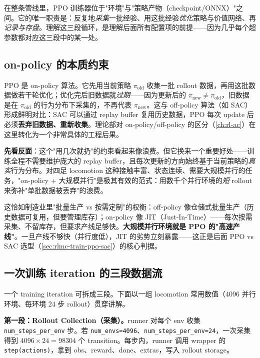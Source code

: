 在整条管线里，PPO 训练器位于"环境"与"策略产物（checkpoint/ONNX）"之间。它的唯一职责是：反复地\emph{采集}一批经验、用这批经验\emph{优化}策略与价值网络、再\emph{记录与存盘}。理解这三段循环，是理解后面所有配置项的前提——因为几乎每个超参数都对应这三段中的某一处。

\subsection{on-policy 的本质约束}

PPO 是 on-policy 算法。它先用当前策略 $\pi_{\text{old}}$ 收集一批 rollout 数据，再用这批数据做若干轮优化；优化完后旧数据就\emph{过期}——因为更新后的 $\pi_{\text{new}}\neq\pi_{\text{old}}$，旧数据是在 $\pi_{\text{old}}$ 的行为分布下采集的，不再代表 $\pi_{\text{new}}$。这与 off-policy 算法（如 SAC）形成鲜明对比：SAC 可以通过 replay buffer 复用历史数据，PPO 每次 update 后必须\textbf{丢弃旧数据、重新收集}。理论部对 on-policy/off-policy 的区分（\cref{ch:rl-ac}）在这里转化为一个非常具体的工程后果。

\textbf{先看反面}：这个"用几次就扔"的约束看起来像浪费。但它换来一个重要好处——训练全程不需要维护庞大的 replay buffer，且每次更新的方向始终基于当前策略的\emph{真实}行为分布。对四足 locomotion 这种接触丰富、状态连续、需要大规模并行的任务，"on-policy + 大规模并行"是极其有效的范式：用数千个并行环境的\emph{短} rollout 来弥补"单批数据被丢弃"的浪费。

\begin{insight}\label{ins:rlmc-onpolicy-jit}
这恰如制造业里"批量生产 vs 按需定制"的权衡：off-policy 像仓储式批量生产（历史数据可复用，但要管理库存）；on-policy 像 JIT（Just-In-Time）——每次按需采集、不留库存，但要求产线足够快。\textbf{大规模并行环境就是 PPO 的"高速产线"}。一旦产线不够快（并行度低），JIT 的劣势立刻暴露——这正是后面 PPO vs SAC 选型（\cref{sec:rlmc-train-ppo-sac}）的核心判据。
\end{insight}

\subsection{一次训练 iteration 的三段数据流}

一个 training iteration 可拆成三段。下面以一组 locomotion 常用数值（4096 并行环境、每环境 24 步 rollout）贯穿讲解。

\textbf{第一段：Rollout Collection（采集）。}runner 对每个 env 收集 \verb|num_steps_per_env| 步。若 \verb|num_envs=4096|、\verb|num_steps_per_env=24|，一次采集得到 $4096\times24=98304$ 个 transition。每步内，runner 调用 wrapper 的 \verb|step(actions)|，拿到 obs、reward、done、extras，写入 rollout storage。

